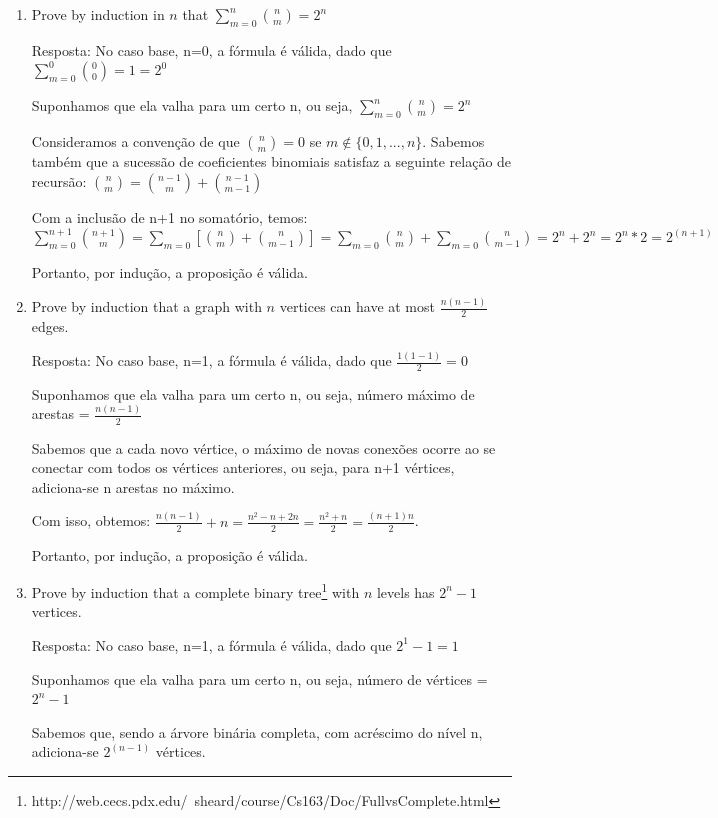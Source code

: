 \documentclass{article}
\begin{document}
\begin{enumerate}
  \item Prove by induction in $n$ that \(\sum_{m=0}^{n}{n \choose m}=2^n\)
  
  Resposta: No caso base, n=0, a fórmula é válida, dado que \(\sum_{m=0}^{0}{0 \choose 0}=1=2^0\)
  
  Suponhamos que ela valha para um certo n, ou seja, \(\sum_{m=0}^{n}{n \choose m}=2^n\)
  
  Consideramos a convenção de que 
  ${n \choose m} = 0$ se 
  $m \notin \{0,1,...,n\}$. Sabemos também que a sucessão de coeficientes binomiais satisfaz a seguinte relação de recursão: 
  \({n \choose m} = {n-1 \choose m} + {n-1 \choose m-1}\)
  
  Com a inclusão de n+1 no somatório, temos: 
  \(\sum_{m=0}^{n+1}{n+1 \choose m} = \sum_{m=0}^{}[{n \choose m} + {n \choose m-1}] = \sum_{m=0}^{}{n \choose m} + \sum_{m=0}^{}{n \choose m-1} = 2^n + 2^n = 2^n*2 = 2^{(n+1)}\)
  
  Portanto, por indução, a proposição é válida.
  
  \item Prove by induction that a graph with $n$ vertices can have at most  $\frac{n(n-1)}{2}$ edges.
  
  Resposta: 
  No caso base, n=1, a fórmula é válida, dado que $\frac{1(1-1)}{2} = 0$
  
  Suponhamos que ela valha para um certo n, ou seja, número máximo de arestas =  
  $\frac{n(n-1)}{2}$
  
  Sabemos que a cada novo vértice, o máximo de novas conexões ocorre ao se conectar com todos os vértices anteriores, ou seja, para n+1 vértices, adiciona-se n arestas no máximo.
  
  Com isso, obtemos: $\frac{n(n-1)}{2} + n = \frac{n^2 - n + 2n}{2} = \frac{n^2 + n}{2} = \frac{(n+1)n}{2}$. 
  
  Portanto, por indução, a proposição é válida.
  
  
  \item Prove by induction that a complete binary tree\footnote{http://web.cecs.pdx.edu/~sheard/course/Cs163/Doc/FullvsComplete.html} with $n$ levels has $2^n-1$ vertices.
  
  Resposta: 
  No caso base, n=1, a fórmula é válida, dado que $2^1-1 = 1$
  
  Suponhamos que ela valha para um certo n, ou seja, número de vértices =  
  $2^n-1$
  
  Sabemos que, sendo a árvore binária completa, com acréscimo do nível n, adiciona-se $2^{(n-1)}$ vértices.
  

\end{enumerate}
\end{document}
